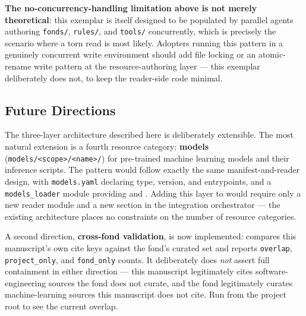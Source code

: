 \documentclass[
]{article}
\begin{document}
\textbf{The no-concurrency-handling limitation above is not merely
theoretical}: this exemplar is itself designed to be populated by
parallel agents authoring \texttt{fonds/}, \texttt{rules/}, and
\texttt{tools/} concurrently, which is precisely the scenario where a
torn read is most likely. Adopters running this pattern in a genuinely
concurrent write environment should add file locking or an atomic-rename
write pattern at the resource-authoring layer --- this exemplar
deliberately does not, to keep the reader-side code minimal.

\subsection{Future Directions}\label{future-directions}

The three-layer architecture described here is deliberately extensible.
The most natural extension is a fourth resource category:
\textbf{models}
(\texttt{models/\textless{}scope\textgreater{}/\textless{}name\textgreater{}/})
for pre-trained machine learning models and their inference scripts. The
pattern would follow exactly the same manifest-and-reader design, with
\texttt{models.yaml} declaring type, version, and entrypoints, and a
\texttt{models\_loader} module providing  and
. Adding this layer to
 would require only a new reader
module and a new section in the integration orchestrator --- the
existing architecture places no constraints on the number of resource
categories.

A second direction, \textbf{cross-fond validation}, is now implemented:
 compares
this manuscript's own cite keys against the
 fond's curated set and reports
\texttt{overlap}, \texttt{project\_only}, and \texttt{fond\_only}
counts. It deliberately does \emph{not} assert full containment in
either direction --- this manuscript legitimately cites
software-engineering sources the fond does not curate, and the fond
legitimately curates machine-learning sources this manuscript does not
cite. Run
from the project root to see the current overlap.
\end{document}
